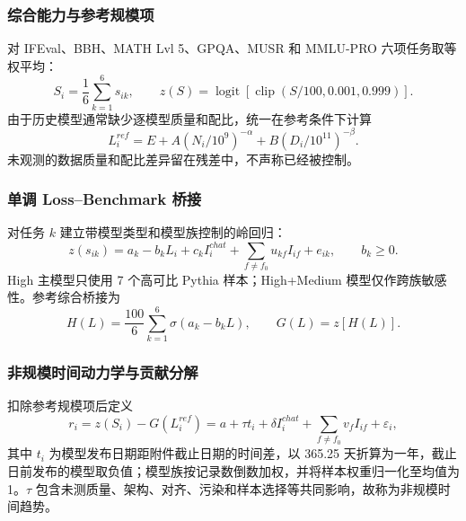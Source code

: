 \documentclass[bwprint]{gmcmthesis}
\numberwithin{equation}{section}
\numberwithin{figure}{section}
\numberwithin{table}{section}
\begin{document}
        \subsubsection{综合能力与参考规模项}
        对 IFEval、BBH、MATH Lvl 5、GPQA、MUSR 和 MMLU-PRO 六项任务取等权平均：
        \begin{equation}
        S_i=\frac16\sum_{k=1}^{6}s_{ik},\qquad
        z(S)=\operatorname{logit}\!\left[\operatorname{clip}(S/100,0.001,0.999)\right].
        \label{eq:p4_score}
        \end{equation}
        由于历史模型通常缺少逐模型质量和配比，统一在参考条件下计算
        \begin{equation}
        L_i^{ref}=E+A(N_i/10^9)^{-\alpha}+B(D_i/10^{11})^{-\beta}.
        \label{eq:p4_reference_loss}
        \end{equation}
        未观测的数据质量和配比差异留在残差中，不声称已经被控制。

        \subsubsection{单调 Loss--Benchmark 桥接}
        对任务 $k$ 建立带模型类型和模型族控制的岭回归：
        \begin{equation}
        z(s_{ik})=a_k-b_kL_i+c_kI_i^{chat}+\sum_{f\ne f_0}u_{kf}I_{if}+e_{ik},\qquad b_k\ge0.
        \label{eq:p4_bridge}
        \end{equation}
        High 主模型只使用 7 个高可比 Pythia 样本；High+Medium 模型仅作跨族敏感性。参考综合桥接为
        \begin{equation}
        H(L)=\frac{100}{6}\sum_{k=1}^{6}\sigma(a_k-b_kL),\qquad G(L)=z[H(L)].
        \label{eq:p4_bridge_function}
        \end{equation}

        \subsubsection{非规模时间动力学与贡献分解}
        扣除参考规模项后定义
        \begin{equation}
        r_i=z(S_i)-G(L_i^{ref})
        =a+\tau t_i+\delta I_i^{chat}+\sum_{f\ne f_0}v_fI_{if}+\varepsilon_i,
        \label{eq:p4_dynamics}
        \end{equation}
        其中 $t_i$ 为模型发布日期距附件截止日期的时间差，以 365.25 天折算为一年，截止日前发布的模型取负值；模型族按记录数倒数加权，并将样本权重归一化至均值为 1。$\tau$ 包含未测质量、架构、对齐、污染和样本选择等共同影响，故称为非规模时间趋势。
\end{document}
